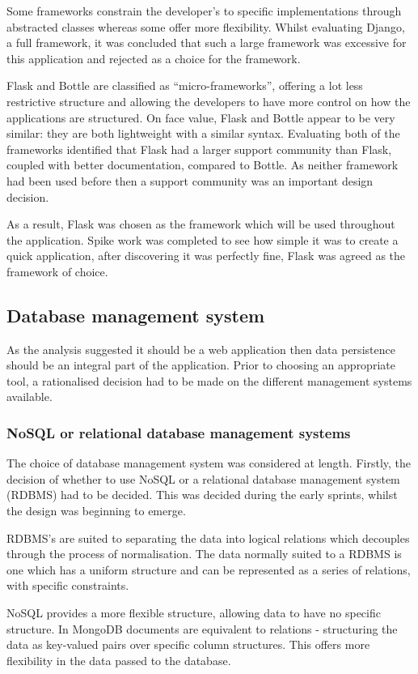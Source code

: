 Some frameworks constrain the developer's to specific implementations through abstracted classes whereas some offer more flexibility. Whilst evaluating Django, a full framework, it was concluded that such a large framework was excessive for this application and rejected as a choice for the framework.

Flask and Bottle are classified as ``micro-frameworks'', offering a lot less restrictive structure and allowing the developers to have more control on how the applications are structured. On face value, Flask and Bottle appear to be very similar: they are both lightweight with a similar syntax. Evaluating both of the frameworks identified that Flask had a larger support community than Flask, coupled with better documentation, compared to Bottle. As neither framework had been used before then a support community was an important design decision.

As a result, Flask was chosen as the framework which will be used throughout the application. Spike work was completed to see how simple it was to create a quick application, after discovering it was perfectly fine, Flask was agreed as the framework of choice.

\subsection{Database management system}
As the analysis suggested it should be a web application then data persistence should be an integral part of the application. Prior to choosing an appropriate tool, a rationalised decision had to be made on the different management systems available.

\subsubsection{NoSQL or relational database management systems}
The choice of database management system was considered at length. Firstly, the decision of whether to use NoSQL or a relational database management system (RDBMS) had to be decided. This was decided during the early sprints, whilst the design was beginning to emerge.

RDBMS's are suited to separating the data into logical relations which decouples through the process of normalisation. The data normally suited to a RDBMS is one which has a uniform structure and can be represented as a series of relations, with specific constraints.

NoSQL provides a more flexible structure, allowing data to have no specific structure. In MongoDB \cite{citeulike:14019766} documents are equivalent to relations - structuring the data as key-valued pairs over specific column structures. This offers more flexibility in the data passed to the database.

